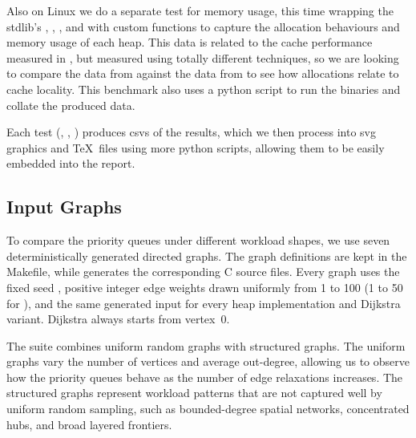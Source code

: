 Also on Linux we do a separate test for memory usage, this time wrapping the
stdlib's , , , and  with custom functions to
capture the allocation behaviours and memory usage of each heap. This data is
related to the cache performance measured in , but measured using totally
different techniques, so we are looking to compare the data from  against the
data from  to see how allocations relate to cache locality. This benchmark
also uses a python script to run the binaries and collate the produced data.

Each test (, , ) produces csvs of the results, which we then
process into svg graphics and \TeX\ files using more python scripts, allowing
them to be easily embedded into the report.

\subsection{Input Graphs}

To compare the priority queues under different workload shapes, we use seven
deterministically generated directed graphs. The graph definitions are kept in
the Makefile, while  generates the corresponding C
source files. Every graph uses the fixed seed , positive integer edge
weights drawn uniformly from 1 to 100 (1 to 50 for ), and the
same generated input for every heap implementation and Dijkstra variant.
Dijkstra always starts from vertex~0.

The suite combines uniform random graphs with structured graphs. The uniform
graphs vary the number of vertices and average out-degree, allowing us to
observe how the priority queues behave as the number of edge relaxations
increases. The structured graphs represent workload patterns that are not
captured well by uniform random sampling, such as bounded-degree spatial
networks, concentrated hubs, and broad layered frontiers.

